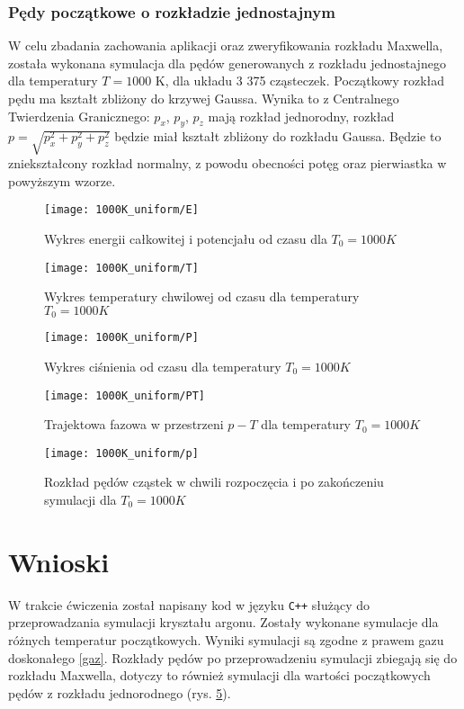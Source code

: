 \documentclass[a4paper,10pt]{article}
\begin{document}
		\subsubsection{Pędy początkowe o rozkładzie jednostajnym}
		W celu zbadania zachowania aplikacji oraz zweryfikowania rozkładu Maxwella, została wykonana symulacja dla pędów generowanych z rozkładu jednostajnego dla temperatury $T = 1000$ K, dla układu 3 375 cząsteczek. Początkowy rozkład pędu ma kształt zbliżony do krzywej Gaussa. Wynika to z Centralnego Twierdzenia Granicznego: $p_x$, $p_y$, $p_z$ mają rozkład jednorodny, rozkład $p = \sqrt{p_x^2 + p_y^2 + p_z^2}$ będzie miał kształt zbliżony do rozkładu Gaussa. Będzie to zniekształcony rozkład normalny, z powodu obecności potęg oraz pierwiastka w powyższym wzorze.
	    \begin{figure}[h]
		    \centering
		    \texttt{[image: 1000K\_uniform/E]}
		    \caption{Wykres energii całkowitej i potencjału od czasu dla $T_0 = 1000 K$}
		    \label{1000kue}
	    \end{figure}
	    \begin{figure}[h]
		    \centering
		    \texttt{[image: 1000K\_uniform/T]}
		    \caption{Wykres temperatury chwilowej od czasu dla temperatury $T_0 = 1000 K$}
		    \label{1000kut}
	    \end{figure}
	    \begin{figure}[h]
		    \centering
		    \texttt{[image: 1000K\_uniform/P]}
		    \caption{Wykres ciśnienia od czasu dla temperatury $T_0 = 1000 K$}
		    \label{1000kup}
	    \end{figure}
	    \begin{figure}[h]
		    \centering
		    \texttt{[image: 1000K\_uniform/PT]}
		    \caption{Trajektowa fazowa w przestrzeni $p-T$ dla temperatury $T_0 = 1000 K$}
		    \label{1000kupt}
	    \end{figure}
	    \begin{figure}[h]
		    \centering
		    \texttt{[image: 1000K\_uniform/p]}
		    \caption{Rozkład pędów cząstek w chwili rozpoczęcia i po zakończeniu symulacji dla $T_0 = 1000 K$}
		    \label{1000kupp}
	    \end{figure}
	\clearpage		
	\section{Wnioski}
	W trakcie ćwiczenia został napisany kod w języku \verb|C++| służący do przeprowadzania symulacji kryształu argonu. Zostały wykonane symulacje dla różnych temperatur początkowych. Wyniki symulacji są zgodne z prawem gazu doskonałego \eqref{gaz}. Rozkłady pędów po przeprowadzeniu symulacji zbiegają się do rozkładu Maxwella, dotyczy to również symulacji dla wartości początkowych pędów z rozkładu jednorodnego (rys. \ref{1000kupp}).
\end{document}
